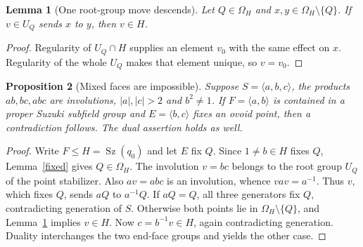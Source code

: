 \documentclass[11pt,a4paper]{article}
\newtheorem{lemma}{Lemma}\newtheorem{proposition}[lemma]{Proposition}
\newcommand{\Sz}{\operatorname{Sz}}\newcommand{\gen}[1]{\langle#1\rangle}
\begin{document}
\begin{lemma}[One root-group move descends]\label{move}
Let $Q\in\Omega_H$ and $x,y\in\Omega_H\setminus\{Q\}$. If
$v\in U_Q$ sends $x$ to $y$, then $v\in H$.
\end{lemma}
\begin{proof}
Regularity of $U_Q\cap H$ supplies an element $v_0$ with the same
effect on $x$. Regularity of the whole $U_Q$ makes that element unique,
so $v=v_0$.
\end{proof}

\begin{proposition}[Mixed faces are impossible]\label{mixed}
Suppose $S=\gen{a,b,c}$, the products $ab,bc,abc$ are involutions,
$|a|,|c|>2$ and $b^2\ne1$. If $F=\gen{a,b}$ is contained in a
proper Suzuki subfield group and $E=\gen{b,c}$ fixes an ovoid point,
then a contradiction follows. The dual assertion holds as well.
\end{proposition}
\begin{proof}
Write $F\le H=\Sz(q_0)$ and let $E$ fix $Q$. Since $1\ne b\in H$
fixes $Q$, Lemma~\ref{fixed} gives $Q\in\Omega_H$. The involution
$v=bc$ belongs to the root group $U_Q$ of the point stabilizer. Also
$av=abc$ is an involution, whence $vav=a^{-1}$. Thus $v$, which fixes
$Q$, sends $aQ$ to $a^{-1}Q$. If $aQ=Q$, all three generators fix
$Q$, contradicting generation of $S$. Otherwise both points lie in
$\Omega_H\setminus\{Q\}$, and Lemma~\ref{move} implies $v\in H$.
Now $c=b^{-1}v\in H$, again contradicting generation. Duality
interchanges the two end-face groups and yields the other case.
\end{proof}
\end{document}
